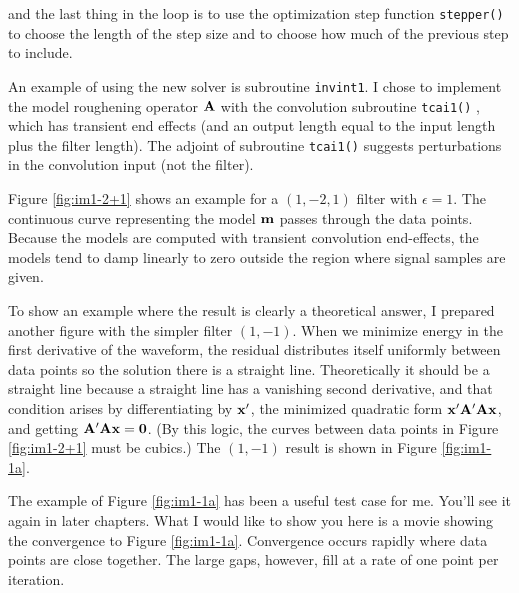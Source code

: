 and the last thing in the loop is to use
the optimization step function \texttt{stepper()} 
to choose the length of the step size
and to choose how much of the previous step to include.
\par
An example of using the new solver is subroutine \texttt{invint1}.
I chose to implement the model roughening operator $\bold A$
with the convolution subroutine \texttt{tcai1()} ,
which has transient end effects
(and an output length equal to the input length plus the filter length).
The adjoint of subroutine {\tt tcai1()} suggests perturbations
in the convolution input (not the filter).
\par
Figure \ref{fig:im1-2+1} shows an example for a $(1,-2,1)$ filter with $\epsilon = 1$.
The continuous curve representing the model $\bold m$
passes through the data points.
Because the models are computed with transient convolution end-effects,
the models tend to damp linearly to zero outside the region where
signal samples are given.
\par
To show an example where the result is clearly a theoretical answer,
I prepared another figure with the simpler filter $(1,-1)$.
When we minimize energy in the first derivative of the waveform,
the residual distributes itself uniformly
between data points
so the solution there is a straight line.
Theoretically it should be a straight line
because a straight line has a vanishing second derivative,
and that condition arises by differentiating by $\bold x'$,
the minimized quadratic form
$\bold x' \bold A' \bold A \bold x$, and getting
$         \bold A' \bold A \bold x=\bold 0$.
(By this logic, the curves between data points in Figure \ref{fig:im1-2+1}
must be cubics.)
The $(1,-1)$ result is shown in Figure \ref{fig:im1-1a}.
\par
The example of
Figure \ref{fig:im1-1a}
has been a useful test case for me.
You'll see it again in later chapters.
What I would like to show you here is a movie showing the convergence
to Figure \ref{fig:im1-1a}.
Convergence occurs rapidly where data points are close together.
The large gaps, however, fill at a rate of one point per iteration.

